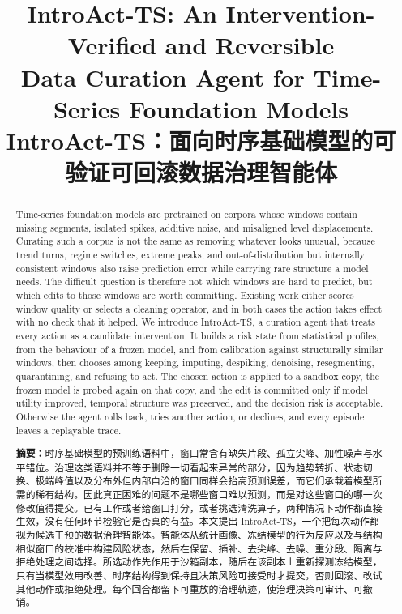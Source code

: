 \documentclass{article}
\title{IntroAct-TS: An Intervention-Verified and Reversible \\
Data Curation Agent for Time-Series Foundation Models \\[4pt]
\large IntroAct-TS：面向时序基础模型的可验证可回滚数据治理智能体}
\begin{document}
\maketitle

\begin{abstract}
Time-series foundation models are pretrained on corpora whose windows contain missing segments, isolated spikes, additive noise, and misaligned level displacements. Curating such a corpus is not the same as removing whatever looks unusual, because trend turns, regime switches, extreme peaks, and out-of-distribution but internally consistent windows also raise prediction error while carrying rare structure a model needs. The difficult question is therefore not which windows are hard to predict, but which edits to those windows are worth committing. Existing work either scores window quality or selects a cleaning operator, and in both cases the action takes effect with no check that it helped. We introduce IntroAct-TS, a curation agent that treats every action as a candidate intervention. It builds a risk state from statistical profiles, from the behaviour of a frozen model, and from calibration against structurally similar windows, then chooses among keeping, imputing, despiking, denoising, resegmenting, quarantining, and refusing to act. The chosen action is applied to a sandbox copy, the frozen model is probed again on that copy, and the edit is committed only if model utility improved, temporal structure was preserved, and the decision risk is acceptable. Otherwise the agent rolls back, tries another action, or declines, and every episode leaves a replayable trace.

\vspace{4pt}
\noindent \textbf{摘要：}时序基础模型的预训练语料中，窗口常含有缺失片段、孤立尖峰、加性噪声与水平错位。治理这类语料并不等于删除一切看起来异常的部分，因为趋势转折、状态切换、极端峰值以及分布外但内部自洽的窗口同样会抬高预测误差，而它们承载着模型所需的稀有结构。因此真正困难的问题不是哪些窗口难以预测，而是对这些窗口的哪一次修改值得提交。已有工作或者给窗口打分，或者挑选清洗算子，两种情况下动作都直接生效，没有任何环节检验它是否真的有益。本文提出 IntroAct-TS，一个把每次动作都视为候选干预的数据治理智能体。智能体从统计画像、冻结模型的行为反应以及与结构相似窗口的校准中构建风险状态，然后在保留、插补、去尖峰、去噪、重分段、隔离与拒绝处理之间选择。所选动作先作用于沙箱副本，随后在该副本上重新探测冻结模型，只有当模型效用改善、时序结构得到保持且决策风险可接受时才提交，否则回滚、改试其他动作或拒绝处理。每个回合都留下可重放的治理轨迹，使治理决策可审计、可撤销。
\end{abstract}
\end{document}
